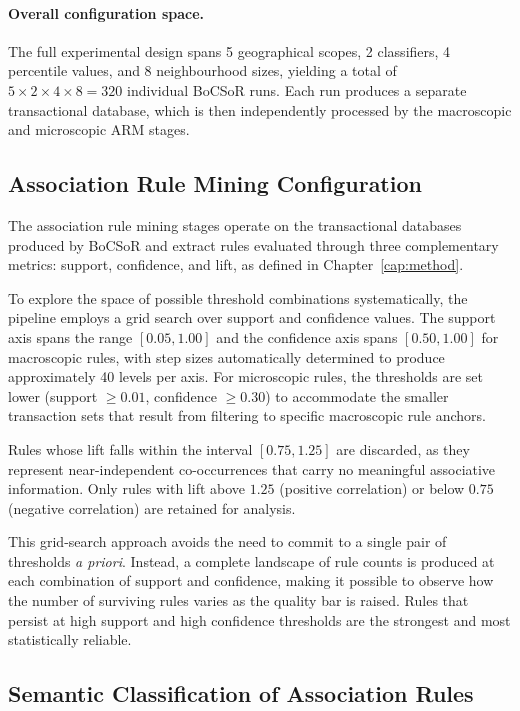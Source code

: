 \paragraph{Overall configuration space.} The full experimental design spans 5 geographical scopes, 2 classifiers, 4 percentile values, and 8 neighbourhood sizes, yielding a total of $5 \times 2 \times 4 \times 8 = 320$ individual BoCSoR runs. Each run produces a separate transactional database, which is then independently processed by the macroscopic and microscopic ARM stages.

\subsection{Association Rule Mining Configuration}
\label{sec:arm-configuration}

The association rule mining stages operate on the transactional databases produced by BoCSoR and extract rules evaluated through three complementary metrics: support, confidence, and lift, as defined in Chapter~\ref{cap:method}.

To explore the space of possible threshold combinations systematically, the pipeline employs a grid search over support and confidence values. The support axis spans the range $[0.05, 1.00]$ and the confidence axis spans $[0.50, 1.00]$ for macroscopic rules, with step sizes automatically determined to produce approximately 40 levels per axis. For microscopic rules, the thresholds are set lower (support $\geq 0.01$, confidence $\geq 0.30$) to accommodate the smaller transaction sets that result from filtering to specific macroscopic rule anchors.

Rules whose lift falls within the interval $[0.75, 1.25]$ are discarded, as they represent near-independent co-occurrences that carry no meaningful associative information. Only rules with lift above $1.25$ (positive correlation) or below $0.75$ (negative correlation) are retained for analysis.

This grid-search approach avoids the need to commit to a single pair of thresholds \textit{a priori}. Instead, a complete landscape of rule counts is produced at each combination of support and confidence, making it possible to observe how the number of surviving rules varies as the quality bar is raised. Rules that persist at high support and high confidence thresholds are the strongest and most statistically reliable.

\subsection{Semantic Classification of Association Rules}
\label{sec:semantic-classification}

